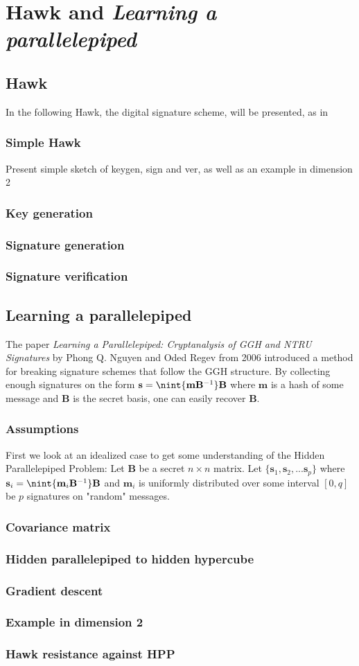 \chapter{Hawk and \textit{Learning a parallelepiped}}

\section{Hawk}
In the following Hawk, the digital signature scheme, will be presented, as in \cite{hawkspec}
\subsection{Simple Hawk}
Present simple sketch of keygen, sign and ver, as well as an example in dimension 2
\subsection{Key generation}
\subsection{Signature generation}
\subsection{Signature verification}

\section{Learning a parallelepiped}
The paper \textit{Learning a Parallelepiped: Cryptanalysis of GGH and NTRU Signatures} by Phong Q. Nguyen and Oded Regev from 2006 \cite{hpp}
introduced a method for breaking signature schemes that follow the GGH structure. By collecting enough signatures on the form $\mathbf{s} = \nint{\textbf{m} \mathbf{B}^{-1}}\mathbf{B}$
where $\mathbf{m}$ is a hash of some message and $\mathbf{B}$ is the secret basis, one can easily recover $\mathbf{B}$. 
\subsection{Assumptions}
First we look at an idealized case to get some understanding of the Hidden Parallelepiped Problem:
Let $\mathbf{B}$ be a secret $n \times n$ matrix. Let $\{\mathbf{s}_1, \mathbf{s}_2, ... \mathbf{s}_p\}$ where $\mathbf{s}_i = \nint{\textbf{m}_i \mathbf{B}^{-1}}\mathbf{B}$
and $\mathbf{m}_i$ is uniformly distributed over some interval $[0, q]$ be $p$ signatures on "random" messages.
\subsection{Covariance matrix}
\subsection{Hidden parallelepiped to hidden hypercube}
\subsection{Gradient descent}
\subsection{Example in dimension 2}
\subsection{Hawk resistance against HPP}
